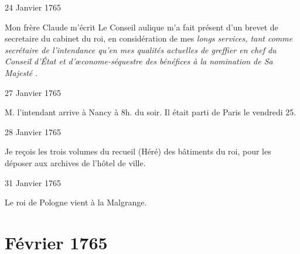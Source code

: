                      \begin{diary}{24 Janvier 1765}{}
                        
                        
                           Mon frère Claude m'écrit
                                 \og Le Conseil aulique
                              m'a fait présent d'un brevet de secretaire du
                              cabinet du roi, en considération de mes \emph{longs
                                 services, tant comme secrétaire de l'intendance
                                 qu'en mes qualités actuelles de greffier en chef du Conseil d’État et
                                    d'œconome-séquestre
                                 des
                                 bénéfices à la nomination de Sa Majesté}
                            \fg{}. \bigskip
        
        
                     \end{diary}
                     \begin{diary}{27 Janvier 1765}{}
                        
                        
                           M. l'intendant arrive à
                              Nancy à 8h. du
                           soir. Il était parti de Paris
                           le vendredi 25. \bigskip
        
        
                     \end{diary}

                     \begin{diary}{28 Janvier 1765}{}
                        
                        
                           Je reçois les trois volumes du recueil
                              (Héré) des bâtiments du roi, pour les
                           déposer aux archives de l'hôtel de
                              ville. \bigskip
        
        
                     \end{diary}

                     \begin{diary}{31 Janvier 1765}{}
                        
                        
                           Le roi de Pologne vient à
                              la Malgrange. \bigskip
        
        
                     \end{diary}
                  \chapter*{Février 1765}
                     
